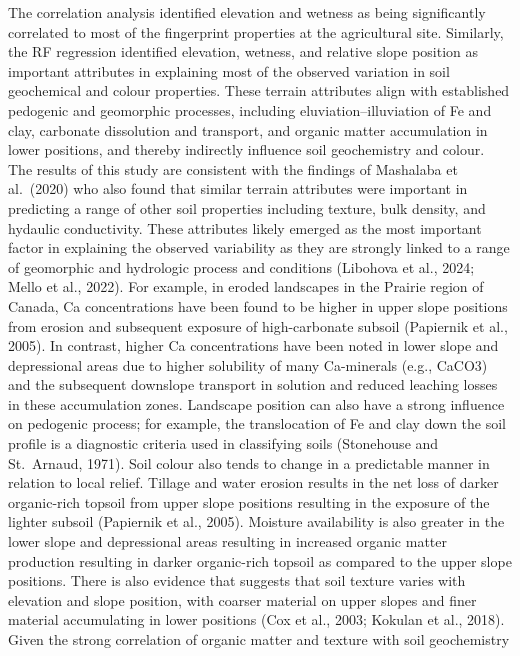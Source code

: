 \documentclass[
  number]{elsarticle}
\begin{document}
The correlation analysis identified elevation and wetness as being
significantly correlated to most of the fingerprint properties at the
agricultural site. Similarly, the RF regression identified elevation,
wetness, and relative slope position as important attributes in
explaining most of the observed variation in soil geochemical and colour
properties. These terrain attributes align with established pedogenic
and geomorphic processes, including eluviation--illuviation of Fe and
clay, carbonate dissolution and transport, and organic matter
accumulation in lower positions, and thereby indirectly influence soil
geochemistry and colour. The results of this study are consistent with
the findings of Mashalaba et al.~(2020) who also found that similar
terrain attributes were important in predicting a range of other soil
properties including texture, bulk density, and hydaulic conductivity.
These attributes likely emerged as the most important factor in
explaining the observed variability as they are strongly linked to a
range of geomorphic and hydrologic process and conditions (Libohova et
al., 2024; Mello et al., 2022). For example, in eroded landscapes in the
Prairie region of Canada, Ca concentrations have been found to be higher
in upper slope positions from erosion and subsequent exposure of
high-carbonate subsoil (Papiernik et al., 2005). In contrast, higher Ca
concentrations have been noted in lower slope and depressional areas due
to higher solubility of many Ca-minerals (e.g., CaCO3) and the
subsequent downslope transport in solution and reduced leaching losses
in these accumulation zones. Landscape position can also have a strong
influence on pedogenic process; for example, the translocation of Fe and
clay down the soil profile is a diagnostic criteria used in classifying
soils (Stonehouse and St.~Arnaud, 1971). Soil colour also tends to
change in a predictable manner in relation to local relief. Tillage and
water erosion results in the net loss of darker organic-rich topsoil
from upper slope positions resulting in the exposure of the lighter
subsoil (Papiernik et al., 2005). Moisture availability is also greater
in the lower slope and depressional areas resulting in increased organic
matter production resulting in darker organic-rich topsoil as compared
to the upper slope positions. There is also evidence that suggests that
soil texture varies with elevation and slope position, with coarser
material on upper slopes and finer material accumulating in lower
positions (Cox et al., 2003; Kokulan et al., 2018). Given the strong
correlation of organic matter and texture with soil geochemistry
\end{document}
